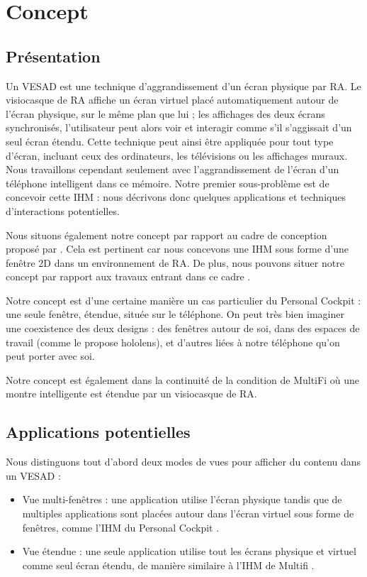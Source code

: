\chapter{Concept}
\label{ch:concept}

\section{Présentation}
\label{sec:concept_introduction}

Un VESAD est une technique d'aggrandissement d'un écran physique par RA. Le visiocasque de RA affiche un écran virtuel placé automatiquement autour de l'écran physique, sur le même plan que lui ; les affichages des deux écrans synchronisés, l'utilisateur peut alors voir et interagir comme s'il s'aggissait d'un seul écran étendu. Cette technique peut ainsi être appliquée pour tout type d'écran, incluant ceux des ordinateurs, les télévisions ou les affichages muraux. Nous travaillons cependant seulement avec l'aggrandissement de l'écran d'un téléphone intelligent dans ce mémoire. Notre premier sous-problème est de concevoir cette IHM : nous décrivons donc quelques applications et techniques d'interactions potentielles.

Nous situons également notre concept par rapport au cadre de conception proposé par \cite{Ens2014a}. Cela est pertinent car nous concevons une IHM sous forme d'une fenêtre 2D dans un environnement de RA. De plus, nous pouvons situer notre concept par rapport aux travaux entrant dans ce cadre .

Notre concept est d'une certaine manière un cas particulier du Personal Cockpit : une seule fenêtre, étendue, située sur le téléphone. On peut très bien imaginer une coexistence des deux designs : des fenêtres autour de soi, dans des espaces de travail (comme le propose hololens), et d'autres liées à notre téléphone qu'on peut porter avec soi.

Notre concept est également dans la continuité de la condition  de MultiFi \citep{Grubert2015} où une montre intelligente est étendue par un visiocasque de RA.

\section{Applications potentielles}
\label{sec:concept_applications}

Nous distinguons tout d'abord deux modes de vues pour afficher du contenu dans un VESAD :
\begin{itemize}
  \item Vue multi-fenêtres  : une application utilise l'écran physique tandis que de multiples applications sont placées autour dans l'écran virtuel sous forme de fenêtres, comme l'IHM du Personal Cockpit \citep{Ens2014}.
  \item Vue étendue  : une seule application utilise tout les écrans physique et virtuel comme seul écran étendu, de manière similaire à l'IHM de Multifi \citep{Grubert2015}.
\end{itemize}
\bigskip

